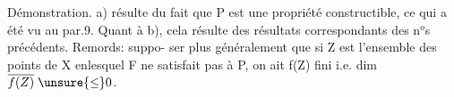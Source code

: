 Démonstration. a) résulte du fait que P est une propriété
constructible, ce qui a été vu au par.9. Quant à b), cela résulte
des résultats correspondants des  n$^{o}$s précédents. Remords: suppo-%
ser plus généralement que si Z est l'ensemble des points de X enlesquel%
F ne satisfait pas à P, on ait f(Z) fini i.e. dim $\overline{f(Z)}\;\unsure{\leq}0$.

